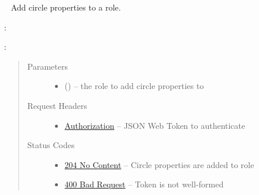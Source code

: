 \documentclass[letterpaper,10pt,english]{sphinxmanual}
\begin{document}
\begin{fulllineitems}
\label{\detokenize{resources/role:put--roles-(role_id)-circle}}~
Add circle properties to a role.

:

\begin{sphinxVerbatim}[commandchars=\\\{\}]
  
 
 
\end{sphinxVerbatim}

:

\begin{sphinxVerbatim}[commandchars=\\\{\}]
  
\end{sphinxVerbatim}
\begin{quote}\begin{description}
\item[{Parameters}] \leavevmode\begin{itemize}
\item {} 
 () -- the role to add circle properties to

\end{itemize}

\item[{Request Headers}] \leavevmode\begin{itemize}
\item {} 
\href{http://tools.ietf.org/html/rfc7235\#section-4.2}{Authorization} -- JSON Web Token to authenticate

\end{itemize}

\item[{Status Codes}] \leavevmode\begin{itemize}
\item {} 
\href{http://www.w3.org/Protocols/rfc2616/rfc2616-sec10.html\#sec10.2.5}{204 No Content} -- Circle properties are added to role

\item {} 
\href{http://www.w3.org/Protocols/rfc2616/rfc2616-sec10.html\#sec10.4.1}{400 Bad Request} -- Token is not well-formed


\end{itemize}
\end{description}
\end{quote}
\end{fulllineitems}
\end{document}
